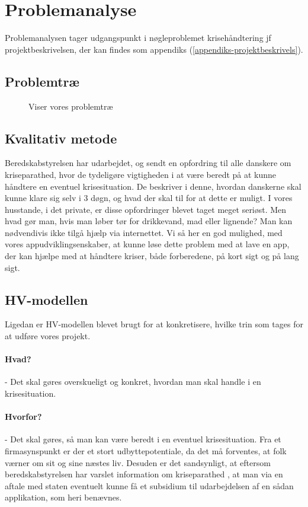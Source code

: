 \section{Problemanalyse}
Problemanalysen tager udgangspunkt i nøgleproblemet krisehåndtering jf projektbeskrivelsen, der kan findes som appendiks (\ref{appendiks-projektbeskrivels}).

\subsection{Problemtræ}
\begin{figure}[H]
    \centering
    \caption{Viser vores problemtræ}
\end{figure}

\subsection{Kvalitativ metode}
Beredskabstyrelsen har udarbejdet, og sendt en opfordring til alle danskere om kriseparathed, hvor de tydeligøre vigtigheden i at være beredt på at kunne håndtere en eventuel krisesituation.
De beskriver i denne, hvordan danskerne skal kunne klare sig selv i 3 døgn, og hvad der skal til for at dette er muligt.
I vores husstande, i det private, er disse opfordringer blevet taget meget seriøst. Men hvad gør man, hvis man løber tør for drikkevand, mad eller lignende? Man kan nødvendivis ikke tilgå hjælp via internettet.
Vi så her en god mulighed, med vores appudviklingsenskaber, at kunne løse dette problem med at lave en app, der kan hjælpe med at håndtere kriser, både forberedene, på kort sigt og på lang sigt.

\subsection{HV-modellen}
Ligedan er HV-modellen blevet brugt for at konkretisere, hvilke trin som tages for at udføre vores projekt.
\paragraph{Hvad?} - Det skal gøres overskueligt og konkret, hvordan man skal handle i en krisesituation.
\paragraph{Hvorfor?} - Det skal gøres, så man kan være beredt i en eventuel krisesituation. Fra et firmasynspunkt er der et stort udbyttepotentiale, da det må forventes, at folk værner om sit og sine næstes liv. Desuden er det sandsynligt, at eftersom beredskabstyrelsen har varslet information om kriseparathed \cite{krisemanual}, at man via en aftale med staten eventuelt kunne få et subsidium til udarbejdelsen af en sådan applikation, som heri benævnes.
